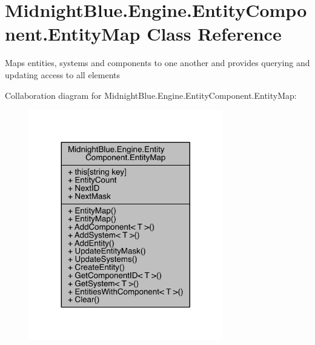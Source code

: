\hypertarget{class_midnight_blue_1_1_engine_1_1_entity_component_1_1_entity_map}{}\section{Midnight\+Blue.\+Engine.\+Entity\+Component.\+Entity\+Map Class Reference}
\label{class_midnight_blue_1_1_engine_1_1_entity_component_1_1_entity_map}


Maps entities, systems and components to one another and provides querying and updating access to all elements  




Collaboration diagram for Midnight\+Blue.\+Engine.\+Entity\+Component.\+Entity\+Map\+:
\nopagebreak
\begin{figure}[H]
\begin{center}
\leavevmode
\includegraphics[width=239pt]{class_midnight_blue_1_1_engine_1_1_entity_component_1_1_entity_map__coll__graph}
\end{center}
\end{figure}
